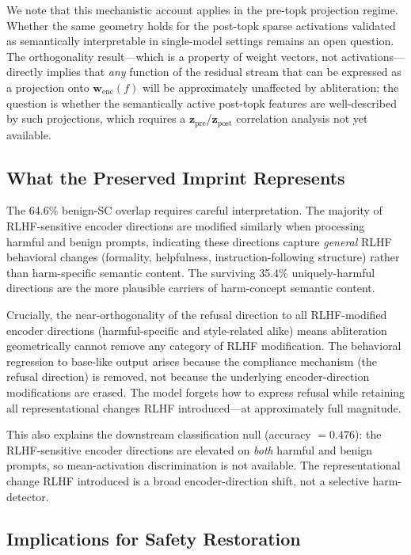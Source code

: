 \documentclass[11pt,letterpaper]{article}
\begin{document}
We note that this mechanistic account applies in the pre-topk projection regime. Whether the same
geometry holds for the post-topk sparse activations validated as semantically interpretable in
single-model settings \citep{Bricken2023,Templeton2024} remains an open question. The orthogonality
result---which is a property of weight vectors, not activations---directly implies that \emph{any}
function of the residual stream that can be expressed as a projection onto $\mathbf{w}_{\text{enc}}(f)$
will be approximately unaffected by abliteration; the question is whether the semantically active
post-topk features are well-described by such projections, which requires a
$\mathbf{z}_{\text{pre}}$/$\mathbf{z}_{\text{post}}$ correlation analysis not yet available.

\subsection{What the Preserved Imprint Represents}

The 64.6\% benign-SC overlap requires careful interpretation. The majority of RLHF-sensitive encoder
directions are modified similarly when processing harmful and benign prompts, indicating these
directions capture \emph{general} RLHF behavioral changes (formality, helpfulness, instruction-following
structure) rather than harm-specific semantic content. The surviving 35.4\% uniquely-harmful
directions are the more plausible carriers of harm-concept semantic content.

Crucially, the near-orthogonality of the refusal direction to all RLHF-modified encoder directions
(harmful-specific and style-related alike) means abliteration geometrically cannot remove any category
of RLHF modification. The behavioral regression to base-like output arises because the compliance
mechanism (the refusal direction) is removed, not because the underlying encoder-direction
modifications are erased. The model forgets how to express refusal while retaining all
representational changes RLHF introduced---at approximately full magnitude.

This also explains the downstream classification null (accuracy $= 0.476$): the RLHF-sensitive
encoder directions are elevated on \emph{both} harmful and benign prompts, so mean-activation
discrimination is not available. The representational change RLHF introduced is a broad
encoder-direction shift, not a selective harm-detector.

\subsection{Implications for Safety Restoration}
\end{document}
